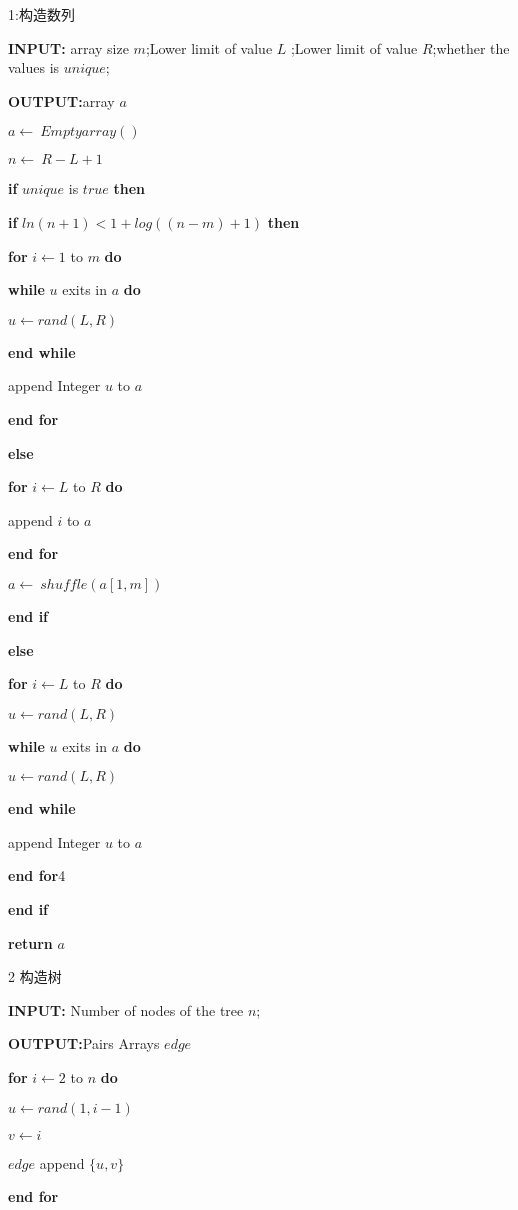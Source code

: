 \documentclass[
]{article}
\author{}
\date{}
\begin{document}
1:构造数列

\textbf{INPUT:} array size \(m\);Lower limit of value \(L\) ;Lower limit
of value \(R\);whether the values is \(unique\);

\textbf{OUTPUT:}array \(a\)

\(a\gets\ Emptyarray()\)

\(n\gets\ R-L+1\)

\textbf{if} \(unique\) is \(true\) \textbf{then}

\textbf{if} \(ln(n+1)<1+log((n-m)+1)\) \textbf{then}

\textbf{for} \(i\gets 1\) to \(m\) \textbf{do}

\textbf{while} \(u\) exits in \(a\) \textbf{do}

\(u\gets rand(L,R)\)

\textbf{end while}

append Integer \(u\) to \(a\)

\textbf{end for}

\textbf{else}

\textbf{for} \(i\gets L\) to \(R\) \textbf{do}

append \(i\) to \(a\)

\textbf{end for}

\(a\gets\ shuffle(a[1,m])\)

\textbf{end if}

\textbf{else}

\textbf{for} \(i\gets L\) to \(R\) \textbf{do}

\(u\gets rand(L,R)\)

\textbf{while} \(u\) exits in \(a\) \textbf{do}

\(u\gets rand(L,R)\)

\textbf{end while}

append Integer \(u\) to \(a\)

\textbf{end for}4

\textbf{end if}

\textbf{return} \(a\)

2 构造树

\textbf{INPUT:} Number of nodes of the tree \(n\);

\textbf{OUTPUT:}Pairs Arrays \(edge\)

\textbf{for} \(i\gets 2\) to \(n\) \textbf{do}

\(u\gets rand(1,i-1)\)

\(v\gets i\)

\(edge\) append \(\{u,v\}\)

\textbf{end for}
\end{document}
